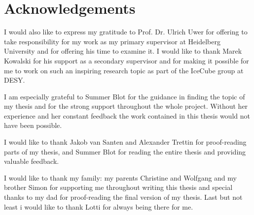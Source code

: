 \chapter*{Acknowledgements}
\thispagestyle{empty}


I would also like to express my gratitude to Prof. Dr. Ulrich Uwer for offering to take responsibility for my work as my primary supervisor at Heidelberg University and for offering his time to examine it. 
I would like to thank Marek Kowalski for his support as a secondary supervisor and for making it possible for me to work on such an inspiring research topic as part of the IceCube group at DESY.

I am especially grateful to Summer Blot for the guidance in finding the topic of my thesis and for the strong support throughout the whole project.
Without her experience and her constant feedback the work contained in this thesis would not have been possible.

I would like to thank Jakob van Santen and Alexander Trettin for proof-reading parts of my thesis, and Summer Blot for reading the entire thesis and providing valuable feedback.

I would like to thank my family: my parents Christine and Wolfgang and my brother Simon for supporting me throughout writing this thesis and special thanks to my dad for proof-reading the final version of my thesis.
Last but not least i would like to thank Lotti for always being there for me.
